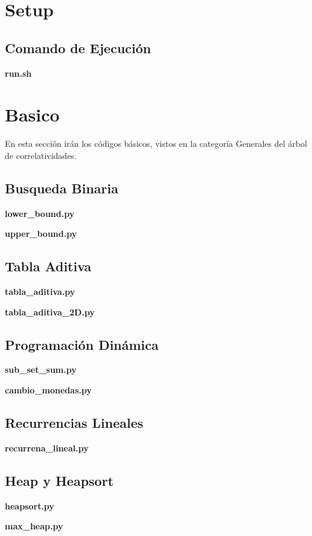 \documentclass{article}
\newcommand\codefile[2]{    
    \textbf{#2}
    
    
}
\begin{document}
\begin{multicols*}{2}

\tableofcontents

\section{Setup}

\subsection{Comando de Ejecución}

\codefile{utilitarios/run.sh}{run.sh}

\section{Basico}
En esta sección irán los códigos básicos, vistos en la categoría Generales del árbol de correlatividades.

\subsection{Busqueda Binaria}
\codefile{basicos/lower_bound.py}{lower\_bound.py}
\codefile{basicos/upper_bound.py}{upper\_bound.py}

\subsection{Tabla Aditiva}
\codefile{basicos/tabla_aditiva.py}{tabla\_aditiva.py}
\codefile{basicos/tabla_aditiva_2D.py}{tabla\_aditiva\_2D.py}

\subsection{Programación Dinámica}
\codefile{basicos/sub_set_sum.py}{sub\_set\_sum.py}
\codefile{basicos/cambio_monedas.py}{cambio\_monedas.py}

\subsection{Recurrencias Lineales}
\codefile{basicos/recurrencia_lineal.py}{recurrena\_lineal.py}

\subsection{Heap y Heapsort}
\codefile{basicos/heapsort.py}{heapsort.py}
\codefile{basicos/max_heap.py}{max\_heap.py}


\end{multicols*}
\end{document}
